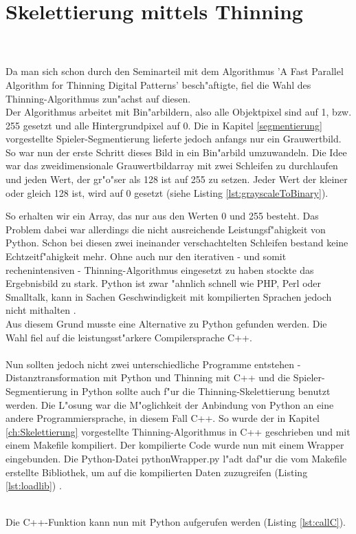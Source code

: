 \section{Skelettierung mittels Thinning} 
\label{implThinning}
 \\ \\
Da man sich schon durch den Seminarteil mit dem Algorithmus 'A Fast Parallel Algorithm for Thinning Digital Patterns' besch"aftigte, fiel die Wahl des Thinning-Algorithmus zun"achst auf diesen. \\
Der Algorithmus arbeitet mit Bin"arbildern, also alle Objektpixel sind auf 1, bzw. 255 gesetzt und alle Hintergrundpixel auf 0. Die in Kapitel \ref{segmentierung} vorgestellte Spieler-Segmentierung lieferte jedoch anfangs nur ein Grauwertbild. So war nun der erste Schritt dieses Bild in ein Bin"arbild umzuwandeln. Die Idee war das zweidimensionale Grauwertbildarray mit zwei Schleifen zu durchlaufen und jeden Wert, der gr"o"ser als 128 ist auf 255 zu setzen. Jeder Wert der kleiner oder gleich 128 ist, wird auf 0 gesetzt (siehe Listing \ref{lst:grayscaleToBinary}). 

So erhalten wir ein Array, das nur aus den Werten 0 und 255 besteht. Das Problem dabei war allerdings die nicht ausreichende Leistungsf"ahigkeit von Python. Schon bei diesen zwei ineinander verschachtelten Schleifen bestand keine Echtzeitf"ahigkeit mehr. Ohne auch nur den iterativen - und somit rechenintensiven - Thinning-Algorithmus eingesetzt zu haben stockte das Ergebnisbild zu stark. Python ist zwar "ahnlich schnell wie PHP, Perl oder Smalltalk, kann in Sachen Geschwindigkeit mit kompilierten Sprachen jedoch nicht mithalten \cite{python}. \\Aus diesem Grund musste eine Alternative zu Python gefunden werden. Die Wahl fiel auf die leistungsst"arkere Compilersprache C++. \\ \\
Nun sollten jedoch nicht zwei unterschiedliche Programme entstehen - Distanztransformation mit Python und Thinning mit C++ und die Spieler-Segmentierung in Python sollte auch f"ur die Thinning-Skelettierung benutzt werden. Die L"osung war die M"oglichkeit der Anbindung von Python an eine andere Programmiersprache, in diesem Fall C++. So wurde der in Kapitel \ref{ch:Skelettierung} vorgestellte Thinning-Algorithmus in C++ geschrieben und mit einem Makefile kompiliert. Der kompilierte Code wurde nun mit einem Wrapper eingebunden. Die Python-Datei pythonWrapper.py l"adt daf"ur die vom Makefile erstellte Bibliothek, um auf die kompilierten Daten zuzugreifen (Listing \ref{lst:loadlib}) .

\\Die C++-Funktion kann nun mit Python aufgerufen werden (Listing \ref{lst:callC}).





